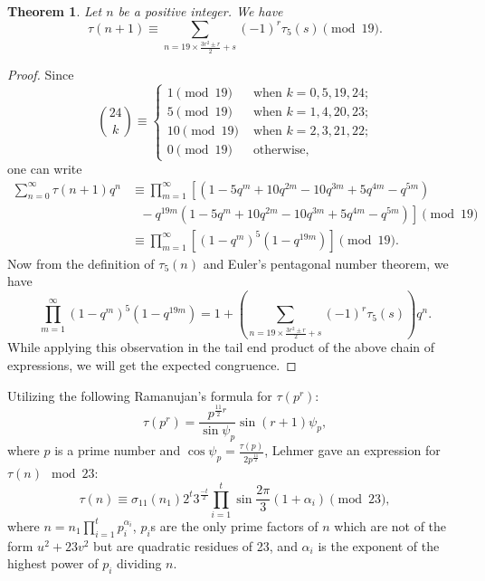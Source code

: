 \documentclass[10pt]{article}
\newtheorem{theorem}{Theorem}[section]
\theoremstyle{definition}
\begin{document}
\begin{theorem}
Let $n$ be a positive integer. We have
\begin{equation}
\tau(n+1)\equiv\sum_{n=19\times\frac{3r^2\pm r}{2}+s}(-1)^r\tau_5(s)\pmod{19}.
\end{equation}
\end{theorem}
\begin{proof}
Since
\[{24\choose{k}}\equiv\begin{cases}
1\pmod{19}&\text{ when $k=0, 5, 19, 24$;}\\
5\pmod{19}&\text{ when $k=1 ,4, 20, 23$;}\\
10\pmod{19}&\text{ when $k=2, 3, 21, 22$;}\\ 
0\pmod{19}&\text{ otherwise,}
\end{cases}
\]
one can write
\begin{align*}
\sum_{n=0}^{\infty}\tau(n+1)q^n
&\equiv\prod_{m=1}^{\infty}\left[\left(1-5q^m+10q^{2m}-10q^{3m}+5q^{4m}-q^{5m}\right)\right.\\
&\text{\ \ \ \ \ \ \ \ }-q^{19m}\left.\left(1-5q^m+10q^{2m}-10q^{3m}+5q^{4m}-q^{5m}\right)\right]\pmod{19}\\
&\equiv \prod_{m=1}^{\infty}\left[(1-q^m)^{5}(1-q^{19m})\right]\pmod{19}.
\end{align*}
Now from the definition of $\tau_5(n)$ and Euler's pentagonal number theorem, we have
\[\prod_{m=1}^{\infty}(1-q^m)^{5}(1-q^{19m})=1+\left(\sum_{n=19\times\frac{3r^2\pm r}{2}+s}(-1)^r\tau_5(s)\right)q^n.
\]
While applying this observation in the tail end product of the above chain of expressions, we will get the expected congruence.
\end{proof}
Utilizing the following Ramanujan's formula \cite[pp. 163-164]{hardy} for $\tau(p^r)$:
\[\tau(p^r)=\frac{p^{\frac{11}{2}r}}{\sin{\psi_p}}\sin{(r+1)\psi_p},
\] 
where $p$ is a prime number and $\cos{\psi_p}=\frac{\tau(p)}{2p^{\frac{11}{2}}}$, Lehmer \cite{Lehmer} gave an expression for $\tau(n)\mod{23}$:
\begin{equation}\label{lehmer}
\tau(n)\equiv\sigma_{11}(n_1)2^t3^{\frac{-t}{2}}\prod\limits_{i=1}^{t}\sin{\frac{2\pi}{3}(1+\alpha_i)}\pmod{23},
\end{equation}
where $n=n_1\prod\limits_{i=1}^{t}p_i^{\alpha_i}$, $p_i$s are the only prime factors of $n$ which are not of the form $u^2+23v^2$ but are quadratic residues of 23, and $\alpha_i$ is the exponent of the highest power of $p_i$ dividing $n$. 
\end{document}
